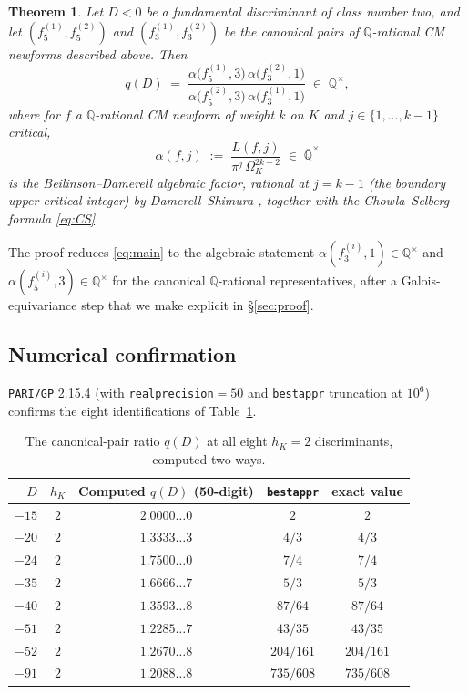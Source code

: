 \documentclass[11pt,a4paper]{amsart}
\theoremstyle{plain}
\newtheorem{theorem}{Theorem}[section]
\theoremstyle{definition}
\newcommand{\Q}{\mathbb{Q}}
\begin{document}
\begin{theorem}
\label{thm:main}
Let $D<0$ be a fundamental discriminant of class number two, and let
$(f_5^{(1)},f_5^{(2)})$ and $(f_3^{(1)},f_3^{(2)})$ be the canonical pairs
of $\Q$-rational CM newforms described above. Then
\begin{equation}
\label{eq:main}
  q(D)
   \;=\;
   \frac{\alpha\bigl(f_5^{(1)},3\bigr)\,\alpha\bigl(f_3^{(2)},1\bigr)}
        {\alpha\bigl(f_5^{(2)},3\bigr)\,\alpha\bigl(f_3^{(1)},1\bigr)}
   \;\in\;\Q^{\times},
\end{equation}
where for $f$ a $\Q$-rational CM newform of weight $k$ on $K$ and
$j\in\{1,\dots,k-1\}$ critical,
\begin{equation}
\label{eq:alpha-def}
  \alpha(f,j) \;:=\; \frac{L(f,j)}{\pi^j\,\Omega_K^{2k-2}}
   \;\in\;\overline{\Q}^{\times}
\end{equation}
is the \emph{Beilinson--Damerell algebraic factor}, rational at
$j=k-1$ (the boundary upper critical integer) by
Damerell--Shimura
\textup{\cite[Theorem~1]{Damerell1971a},\cite[Thm.~1, Thm.~4]{Shimura1976}}
together with the Chowla--Selberg formula \eqref{eq:CS}.
\end{theorem}

The proof reduces \eqref{eq:main} to the algebraic statement
$\alpha(f_3^{(i)},1)\in\Q^{\times}$ and
$\alpha(f_5^{(i)},3)\in\Q^{\times}$ for the canonical $\Q$-rational
representatives, after a Galois-equivariance step that we make explicit in
\S\ref{sec:proof}.

\subsection{Numerical confirmation}

\texttt{PARI/GP} 2.15.4 (with \texttt{realprecision}$=50$ and
\texttt{bestappr} truncation at $10^6$) confirms the eight identifications
of Table~\ref{tab:main}.

\begin{table}[h]
\centering
\caption{The canonical-pair ratio $q(D)$ at all eight $h_K=2$
discriminants, computed two ways.}
\label{tab:main}
\begin{tabular}{rcccc}
\toprule
$D$ & $h_K$ & Computed $q(D)$ (50-digit) & \texttt{bestappr} & exact value\\
\midrule
$-15$ & $2$ & $2.0000\dots0$ & $2$ & $2$\\
$-20$ & $2$ & $1.3333\dots3$ & $4/3$ & $4/3$\\
$-24$ & $2$ & $1.7500\dots0$ & $7/4$ & $7/4$\\
$-35$ & $2$ & $1.6666\dots7$ & $5/3$ & $5/3$\\
$-40$ & $2$ & $1.3593\dots8$ & $87/64$ & $87/64$\\
$-51$ & $2$ & $1.2285\dots7$ & $43/35$ & $43/35$\\
$-52$ & $2$ & $1.2670\dots8$ & $204/161$ & $204/161$\\
$-91$ & $2$ & $1.2088\dots8$ & $735/608$ & $735/608$\\
\bottomrule
\end{tabular}
\end{table}
\end{document}
